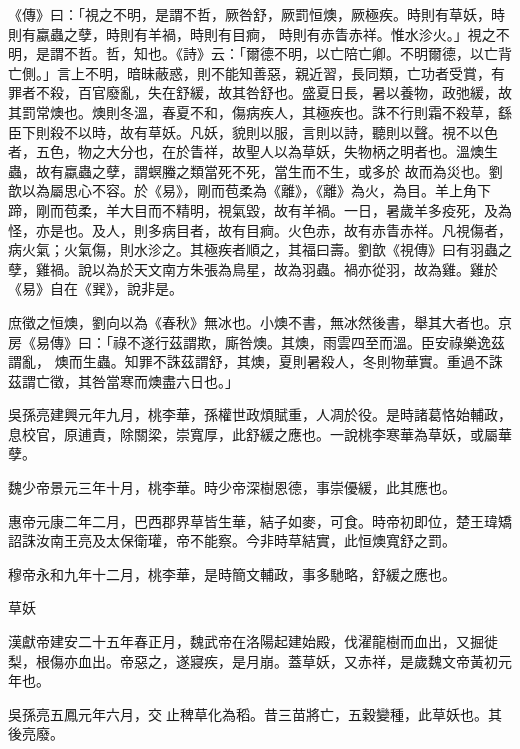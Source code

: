 \begin{pinyinscope}
 《傳》曰：「視之不明，是謂不哲，厥咎舒，厥罰恒燠，厥極疾。時則有草妖，時則有蠃蟲之孽，時則有羊禍，時則有目痾，
 時則有赤眚赤祥。惟水沴火。」視之不明，是謂不哲。哲，知也。《詩》云：「爾德不明，以亡陪亡卿。不明爾德，以亡背亡側。」言上不明，暗昧蔽惑，則不能知善惡，親近習，長同類，亡功者受賞，有罪者不殺，百官廢亂，失在舒緩，故其咎舒也。盛夏日長，暑以養物，政弛緩，故其罰常燠也。燠則冬溫，春夏不和，傷病疾人，其極疾也。誅不行則霜不殺草，繇臣下則殺不以時，故有草妖。凡妖，貌則以服，言則以詩，聽則以聲。視不以色者，五色，物之大分也，在於眚祥，故聖人以為草妖，失物柄之明者也。溫燠生蟲，故有蠃蟲之孽，謂螟螣之類當死不死，當生而不生，或多於
 故而為災也。劉歆以為屬思心不容。於《易》，剛而苞柔為《離》，《離》為火，為目。羊上角下蹄，剛而苞柔，羊大目而不精明，視氣毀，故有羊禍。一日，暑歲羊多疫死，及為怪，亦是也。及人，則多病目者，故有目痾。火色赤，故有赤眚赤祥。凡視傷者，病火氣；火氣傷，則水沴之。其極疾者順之，其福曰壽。劉歆《視傳》曰有羽蟲之孽，雞禍。說以為於天文南方朱張為鳥星，故為羽蟲。禍亦從羽，故為雞。雞於《易》自在《巽》，說非是。



 庶徵之恒燠，劉向以為《春秋》無冰也。小燠不書，無冰然後書，舉其大者也。京房《易傳》曰：「祿不遂行茲謂欺，廝咎燠。其燠，雨雲四至而溫。臣安祿樂逸茲謂亂，
 燠而生蟲。知罪不誅茲謂舒，其燠，夏則暑殺人，冬則物華實。重過不誅茲謂亡徵，其咎當寒而燠盡六日也。」



 吳孫亮建興元年九月，桃李華，孫權世政煩賦重，人凋於役。是時諸葛恪始輔政，息校官，原逋責，除關梁，崇寬厚，此舒緩之應也。一說桃李寒華為草妖，或屬華孽。



 魏少帝景元三年十月，桃李華。時少帝深樹恩德，事崇優緩，此其應也。



 惠帝元康二年二月，巴西郡界草皆生華，結子如麥，可食。時帝初即位，楚王瑋矯詔誅汝南王亮及太保衛瓘，帝不能察。今非時草結實，此恒燠寬舒之罰。



 穆帝永和九年十二月，桃李華，是時簡文輔政，事多馳略，舒緩之應也。



 草妖



 漢獻帝建安二十五年春正月，魏武帝在洛陽起建始殿，伐濯龍樹而血出，又掘徙梨，根傷亦血出。帝惡之，遂寢疾，是月崩。蓋草妖，又赤祥，是歲魏文帝黃初元年也。



 吳孫亮五鳳元年六月，交止稗草化為稻。昔三苗將亡，五穀變種，此草妖也。其後亮廢。




\end{pinyinscope}
